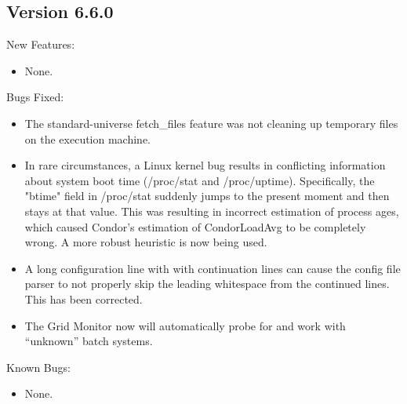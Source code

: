 \subsection{\label{sec:New-6-6-0}Version 6.6.0}

\noindent New Features:

\begin{itemize}

\item None.

\end{itemize}

\noindent Bugs Fixed:

\begin{itemize}

\item The standard-universe fetch\_files feature was not cleaning up
temporary files on the execution machine.

\item In rare circumstances, a Linux kernel bug results in conflicting
information about system boot time (/proc/stat and /proc/uptime).
Specifically, the "btime" field in /proc/stat suddenly jumps to
the present moment and then stays at that value.  This
was resulting in incorrect estimation of process ages, which caused
Condor's estimation of CondorLoadAvg to be completely wrong.  A more
robust heuristic is now being used.

\item A long configuration line with with continuation lines can cause the
config file parser to not properly skip the leading whitespace from
the continued lines.  This has been corrected.

\item The Grid Monitor now will automatically probe for and work with
``unknown'' batch systems.

\end{itemize}

\noindent Known Bugs:

\begin{itemize}

\item None.

\end{itemize}


